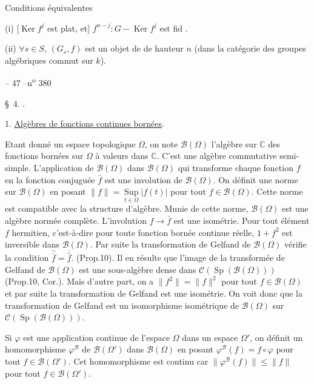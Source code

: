 Conditions équivalentes

(i) [$\operatorname{Ker}f^j$ est plat, et]  $f^{n-j}:G-\operatorname{Ker}f^j$ est fid .

(ii) $\forall s\in S$, $(G_s,f)$ est un objet de  de  hauteur $n$ (dans la catégorie des groupes algébriques commut sur $k$).
\begin{center}-- 47 --\hfill n\textsuperscript{o} 380\end{center}
\begin{center}\S\ 4. .\end{center}
1. \uline{Algèbres de fonctions continues bornées}.

Etant donné un espace topologique $\Omega$, on note $\mathcal B(\Omega)$ l'algèbre sur $\mathbb C$ des fonctions  bornées sur $\Omega$ à valeurs dans $\mathbb C$. C'est une algèbre commutative semi-simple. L'application de $\mathcal B(\Omega)$ dans $\mathcal B(\Omega)$ qui transforme chaque fonction $f$ en la fonction conjuguée $\bar f$ est une involution de $\mathcal B(\Omega)$. On définit une norme sur $\mathcal B(\Omega)$ en posant $\lVert f\rVert=\underset{t\in\Omega}{\operatorname{Sup}}|f(t)|$ pour tout $f\in\mathcal B(\Omega)$. Cette norme est compatible avec la structure d'algèbre. Munie de cette norme, $\mathcal B(\Omega)$ est une algèbre normée complète. L'involution $f\longrightarrow\bar f$ est une isométrie. Pour tout élément $f$ hermitien, c'est-à-dire pour toute fonction bornée continue réelle, $1+f^2$ est inversible dans $\mathcal B(\Omega)$. Par suite la transformation de Gelfand de $\mathcal B(\Omega)$ vérifie la condition $\widehat{\bar f}=\overline{\hat f}$. (Prop.10). Il en résulte que l'image de la transformée de Gelfand de $\mathcal B(\Omega)$ est une sous-algèbre dense dans $\mathcal C(\operatorname{Sp}(\mathcal B(\Omega)))$ (Prop.10, Cor.\quad). Mais d'autre part, on a $\lVert f^2\rVert=\lVert f\rVert^2$ pour tout $f\in\mathcal B(\Omega)$ et par suite la transformation de Gelfand est une isométrie. On voit donc que la transformation de Gelfand est un isomorphisme isométrique de $\mathcal B(\Omega)$ sur $\mathcal C(\operatorname{Sp}(\mathcal B(\Omega)))$.

Si $\varphi$ est une application continue de l'espace $\Omega$ dans un espace $\Omega'$, on définit un homomorphisme $\varphi^{\mathcal B}$ de $\mathcal B(\Omega')$ dans $\mathcal B(\Omega)$ en posant $\varphi^{\mathcal B}(f)=f\circ\varphi$ pour tout $f\in\mathcal B(\Omega')$. Cet homomorphisme est continu car $\lVert\varphi^{\mathcal B}(f)\rVert\leq\lVert f\rVert$ pour tout $f\in\mathcal B(\Omega')$.

